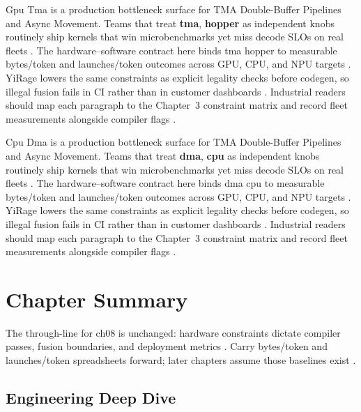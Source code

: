 Gpu Tma is a production bottleneck surface for TMA Double-Buffer Pipelines and Async Movement. Teams that treat \textbf{tma}, \textbf{hopper} as independent knobs routinely ship kernels that win microbenchmarks yet miss decode SLOs on real fleets \citep{nvidia2022hopper,amd2024aie}. The hardware--software contract here binds tma hopper to measurable bytes/token and launches/token outcomes across GPU, CPU, and NPU targets \citep{semianalysis2024tma,dlbook}. YiRage lowers the same constraints as explicit legality checks before codegen, so illegal fusion fails in CI rather than in customer dashboards \citep{amd2024xdna,dao2022flashattention}. Industrial readers should map each paragraph to the Chapter~3 constraint matrix and record fleet measurements alongside compiler flags \citep{amd2024aie,kwon2023vllm}.

Cpu Dma is a production bottleneck surface for TMA Double-Buffer Pipelines and Async Movement. Teams that treat \textbf{dma}, \textbf{cpu} as independent knobs routinely ship kernels that win microbenchmarks yet miss decode SLOs on real fleets \citep{semianalysis2024tma,dlbook}. The hardware--software contract here binds dma cpu to measurable bytes/token and launches/token outcomes across GPU, CPU, and NPU targets \citep{amd2024xdna,dao2022flashattention}. YiRage lowers the same constraints as explicit legality checks before codegen, so illegal fusion fails in CI rather than in customer dashboards \citep{amd2024aie,kwon2023vllm}. Industrial readers should map each paragraph to the Chapter~3 constraint matrix and record fleet measurements alongside compiler flags \citep{dlbook,nvidia2024cudagraphs}.

\section{Chapter Summary}
\label{sec:ch08_summary}

The through-line for ch08 is unchanged: hardware constraints dictate compiler passes, fusion boundaries, and deployment metrics \citep{memoryfloor2026,amd2024xdna}. Carry bytes/token and launches/token spreadsheets forward; later chapters assume those baselines exist \citep{semianalysis2024tma,dlbook}.


\subsection{Engineering Deep Dive}
\label{sec:ch08_deep_dive}


